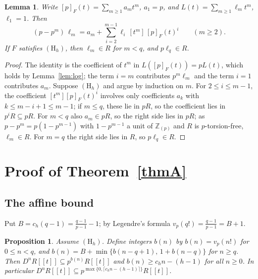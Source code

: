 \documentclass[11pt]{amsart}
\newtheorem{lemma}[thm]{Lemma}
\newtheorem{proposition}[thm]{Proposition}
\theoremstyle{definition}
\theoremstyle{remark}
\newcommand{\Z}{\mathbb Z}
\newcommand{\vp}{v_p}
\begin{document}
\begin{lemma}\label{lem:intlog}
Write $[p]_F(t)=\sum_{m\ge1}a_mt^m$, $a_1=p$, and $L(t)=\sum_{m\ge1}\ell_mt^m$, $\ell_1=1$. Then
\[
 (p-p^m)\,\ell_m=a_m+\sum_{i=2}^{m-1}\ell_i\,[t^m]\,[p]_F(t)^i\qquad(m\ge2).
\]
If $F$ satisfies $(\mathrm H_h)$, then $\ell_m\in R$ for $m<q$, and $p\ell_q\in R$.
\end{lemma}

\begin{proof}
The identity is the coefficient of $t^m$ in $L([p]_F(t))=pL(t)$, which holds by Lemma~\ref{lem:log}; the term $i=m$ contributes $p^m\ell_m$ and the term $i=1$ contributes $a_m$. Suppose $(\mathrm H_h)$ and argue by induction on $m$. For $2\le i\le m-1$, the coefficient $[t^m][p]_F(t)^i$ involves only coefficients $a_k$ with $k\le m-i+1\le m-1$; if $m\le q$, these lie in $pR$, so the coefficient lies in $p^iR\subseteq pR$. For $m<q$ also $a_m\in pR$, so the right side lies in $pR$; as $p-p^m=p(1-p^{m-1})$ with $1-p^{m-1}$ a unit of $\Z_{(p)}$ and $R$ is $p$-torsion-free, $\ell_m\in R$. For $m=q$ the right side lies in $R$, so $p\ell_q\in R$.
\end{proof}

\section{Proof of Theorem~\ref{thmA}}

\subsection{The affine bound}\label{sec:affine}
Put $B=c_h(q-1)=\frac{q-1}{p-1}-1$; by Legendre's formula $\vp(q!)=\frac{q-1}{p-1}=B+1$.

\begin{proposition}\label{prop:affine}
Assume $(\mathrm H_h)$. Define integers $b(n)$ by $b(n)=\vp(n!)$ for $0\le n<q$, and $b(n)=B+\min\{b(n-q+1),\,1+b(n-q)\}$ for $n\ge q$. Then $D^nR[[t]]\subseteq p^{b(n)}R[[t]]$ and $b(n)\ge c_hn-(h-1)$ for all $n\ge0$. In particular $D^nR[[t]]\subseteq p^{\max\{0,\lceil c_hn-(h-1)\rceil\}}R[[t]]$.
\end{proposition}
\end{document}
